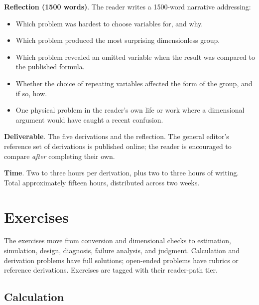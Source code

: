 \begin{project}
\textbf{Reflection (1500 words)}. The reader writes a 1500-word
narrative addressing:

\begin{itemize}[leftmargin=*]
  \item Which problem was hardest to choose variables for, and why.
  \item Which problem produced the most surprising dimensionless
    group.
  \item Which problem revealed an omitted variable when the result
    was compared to the published formula.
  \item Whether the choice of repeating variables affected the form
    of the group, and if so, how.
  \item One physical problem in the reader's own life or work where
    a dimensional argument would have caught a recent confusion.
\end{itemize}

\textbf{Deliverable}. The five derivations and the reflection. The
general editor's reference set of derivations is published online;
the reader is encouraged to compare \emph{after} completing their
own.

\textbf{Time}. Two to three hours per derivation, plus two to three
hours of writing. Total approximately fifteen hours, distributed
across two weeks.
\end{project}

\section{Exercises}

The exercises move from conversion and dimensional checks to
estimation, simulation, design, diagnosis, failure analysis, and
judgment. Calculation and derivation problems have full solutions;
open-ended problems have rubrics or reference derivations. Exercises
are tagged with their reader-path tier.

\subsection*{Calculation}


